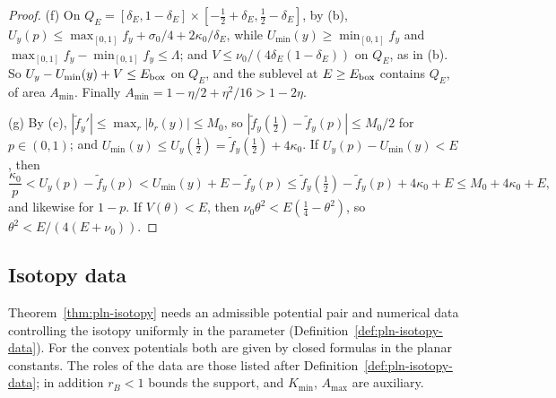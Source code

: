 \begin{proof}
(f) On $Q_E=[\delta_E,1-\delta_E]\times[-\frac12+\delta_E,\frac12-\delta_E]$, by (b), $U_y(p)\le\max_{[0,1]}f_y+\sigma_0/4+2\kappa_0/\delta_E$,
while $U_{\min}(y)\ge\min_{[0,1]}f_y$ and $\max_{[0,1]}f_y-\min_{[0,1]}f_y\le\Lambda$; and $V\le\nu_0/(4\delta_E(1-\delta_E))$ on $Q_E$, as in
(b). So $U_y-U_{\min}(y)+V\le E_{\rm box}$ on $Q_E$, and the sublevel at $E\ge E_{\rm box}$ contains $Q_E$, of area $A_{\min}$. Finally
$A_{\min}=1-\eta/2+\eta^2/16>1-2\eta$.

(g) By (c), $|\tilde f_y'|\le\max_r|b_r(y)|\le M_0$, so $|\tilde f_y(\frac12)-\tilde f_y(p)|\le M_0/2$ for $p\in(0,1)$; and
$U_{\min}(y)\le U_y(\frac12)=\tilde f_y(\frac12)+4\kappa_0$. If $U_y(p)-U_{\min}(y)<E$, then
\[
 \frac{\kappa_0}{p}<U_y(p)-\tilde f_y(p)<U_{\min}(y)+E-\tilde f_y(p)\le\tilde f_y(\tfrac12)-\tilde f_y(p)+4\kappa_0+E
 \le M_0+4\kappa_0+E,
\]
and likewise for $1-p$. If $V(\theta)<E$, then $\nu_0\theta^2<E(\frac14-\theta^2)$, so $\theta^2<E/(4(E+\nu_0))$.
\end{proof}


\subsection{Isotopy data}\label{sec:plc-data}

Theorem~\ref{thm:pln-isotopy} needs an admissible potential pair and numerical data controlling the isotopy uniformly
in the parameter (Definition~\ref{def:pln-isotopy-data}). For the convex potentials both are given by closed formulas
in the planar constants. The roles of the data are those listed after Definition~\ref{def:pln-isotopy-data}; in addition
$r_B<1$ bounds the support, and $K_{\min}$, $A_{\max}$ are auxiliary.

